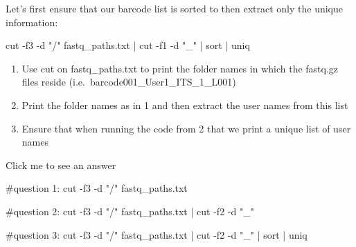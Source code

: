 \documentclass[
  letterpaper,
  DIV=11,
  numbers=noendperiod]{scrreprt}
\newenvironment{Shaded}{}{}
\newcommand{\AttributeTok}[1]{\textcolor[rgb]{0.84,0.23,0.29}{#1}}
\newcommand{\CommentTok}[1]{\textcolor[rgb]{0.42,0.45,0.49}{#1}}
\newcommand{\FunctionTok}[1]{\textcolor[rgb]{0.44,0.26,0.76}{#1}}
\newcommand{\KeywordTok}[1]{\textcolor[rgb]{0.84,0.23,0.29}{#1}}
\newcommand{\NormalTok}[1]{\textcolor[rgb]{0.14,0.16,0.18}{#1}}
\newcommand{\StringTok}[1]{\textcolor[rgb]{0.01,0.18,0.38}{#1}}
\providecommand{\tightlist}{%
  \setlength{\itemsep}{0pt}\setlength{\parskip}{0pt}}\usepackage{longtable,booktabs,array}
\begin{document}
Let's first ensure that our barcode list is sorted to then extract only
the unique information:

\begin{Shaded}
\begin{Highlighting}[]
\FunctionTok{cut} \AttributeTok{{-}f3} \AttributeTok{{-}d} \StringTok{"/"}\NormalTok{ fastq\_paths.txt }\KeywordTok{|} \FunctionTok{cut} \AttributeTok{{-}f1} \AttributeTok{{-}d} \StringTok{"\_"} \KeywordTok{|} \FunctionTok{sort} \KeywordTok{|} \FunctionTok{uniq}
\end{Highlighting}
\end{Shaded}

\begin{tcolorbox}[enhanced jigsaw, title=\textcolor{quarto-callout-caution-color}{\faFire}\hspace{0.5em}{Exercise}, colframe=quarto-callout-caution-color-frame, opacitybacktitle=0.6, rightrule=.15mm, arc=.35mm, left=2mm, colbacktitle=quarto-callout-caution-color!10!white, bottomrule=.15mm, leftrule=.75mm, toprule=.15mm, opacityback=0, bottomtitle=1mm, colback=white, toptitle=1mm, breakable, titlerule=0mm, coltitle=black]

\begin{enumerate}
\def\labelenumi{\arabic{enumi}.}
\tightlist
\item
  Use cut on fastq\_paths.txt to print the folder names in which the
  fastq.gz files reside (i.e.~barcode001\_User1\_ITS\_1\_L001)
\item
  Print the folder names as in 1 and then extract the user names from
  this list
\item
  Ensure that when running the code from 2 that we print a unique list
  of user names
\end{enumerate}

Click me to see an answer

\begin{Shaded}
\begin{Highlighting}[]
\CommentTok{\#question 1:}
\FunctionTok{cut} \AttributeTok{{-}f3} \AttributeTok{{-}d} \StringTok{"/"}\NormalTok{ fastq\_paths.txt}

\CommentTok{\#question 2:}
\FunctionTok{cut} \AttributeTok{{-}f3} \AttributeTok{{-}d} \StringTok{"/"}\NormalTok{ fastq\_paths.txt }\KeywordTok{|} \FunctionTok{cut} \AttributeTok{{-}f2} \AttributeTok{{-}d} \StringTok{"\_"}

\CommentTok{\#question 3:}
\FunctionTok{cut} \AttributeTok{{-}f3} \AttributeTok{{-}d} \StringTok{"/"}\NormalTok{ fastq\_paths.txt }\KeywordTok{|} \FunctionTok{cut} \AttributeTok{{-}f2} \AttributeTok{{-}d} \StringTok{"\_"} \KeywordTok{|} \FunctionTok{sort} \KeywordTok{|} \FunctionTok{uniq}
\end{Highlighting}
\end{Shaded}

\end{tcolorbox}
\end{document}
